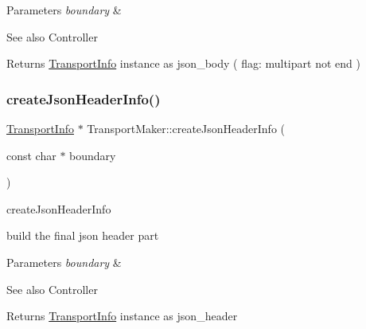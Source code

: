 \begin{DoxyParams}{Parameters}
{\em boundary} & \\
\hline
\end{DoxyParams}
\begin{DoxySeeAlso}{See also}
Controller 
\end{DoxySeeAlso}
\begin{DoxyReturn}{Returns}
\hyperlink{classAlexaEvent_1_1TransportInfo}{Transport\+Info} instance as json\+\_\+body ( flag\+: multipart not end ) 
\end{DoxyReturn}
\mbox{\label{classAlexaEvent_1_1TransportMaker_a294732327697810e82e7b82bbcbf5aaa}} 
\subsubsection{\texorpdfstring{create\+Json\+Header\+Info()}{createJsonHeaderInfo()}}
{\footnotesize\ttfamily \hyperlink{classAlexaEvent_1_1TransportInfo}{Transport\+Info} $\ast$ Transport\+Maker\+::create\+Json\+Header\+Info (\begin{DoxyParamCaption}\item[{const char $\ast$}]{boundary }\end{DoxyParamCaption})}



create\+Json\+Header\+Info 

build the final json header part 
\begin{DoxyParams}{Parameters}
{\em boundary} & \\
\hline
\end{DoxyParams}
\begin{DoxySeeAlso}{See also}
Controller 
\end{DoxySeeAlso}
\begin{DoxyReturn}{Returns}
\hyperlink{classAlexaEvent_1_1TransportInfo}{Transport\+Info} instance as json\+\_\+header 
\end{DoxyReturn}
\mbox{\label{classAlexaEvent_1_1TransportMaker_a0ea3c7a006bcd8e69808438c3e860597}} 
